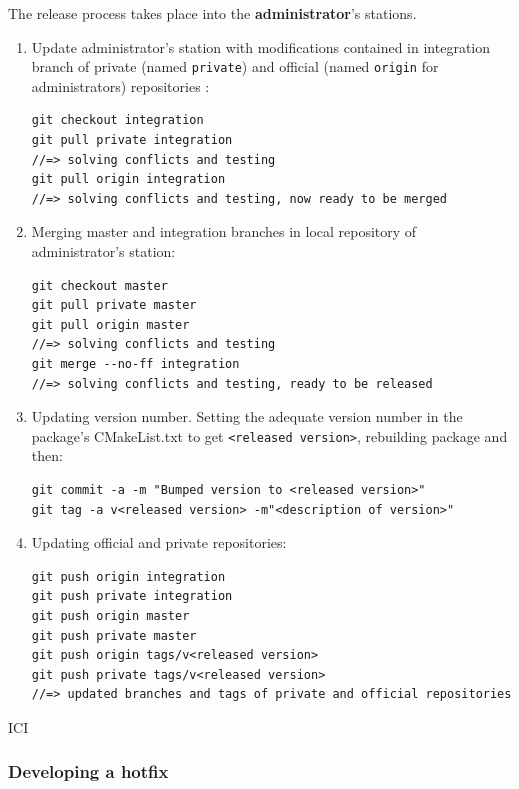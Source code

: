 \documentclass[12pt,a4paper]{article}
\begin{document}
The release process takes place into the \textbf{administrator}'s stations.
\begin{enumerate}
\item Update administrator's station with modifications contained in integration branch of private (named \texttt{private}) and official (named \texttt{origin} for administrators) repositories :
\begin{verbatim}
git checkout integration
git pull private integration
//=> solving conflicts and testing
git pull origin integration
//=> solving conflicts and testing, now ready to be merged
\end{verbatim}

\item Merging master and integration branches in local repository of administrator's station:
\begin{verbatim}
git checkout master
git pull private master
git pull origin master
//=> solving conflicts and testing
git merge --no-ff integration
//=> solving conflicts and testing, ready to be released
\end{verbatim}

\item Updating version number. Setting the adequate version number in the package's CMakeList.txt to get \texttt{<released version>}, rebuilding package and then:
\begin{verbatim}
git commit -a -m "Bumped version to <released version>"
git tag -a v<released version> -m"<description of version>"
\end{verbatim}

\item Updating official and private repositories:
\begin{verbatim}
git push origin integration
git push private integration
git push origin master
git push private master
git push origin tags/v<released version>
git push private tags/v<released version>
//=> updated branches and tags of private and official repositories
\end{verbatim}
\end{enumerate}

ICI
\subsubsection{Developing a hotfix}
\end{document}
